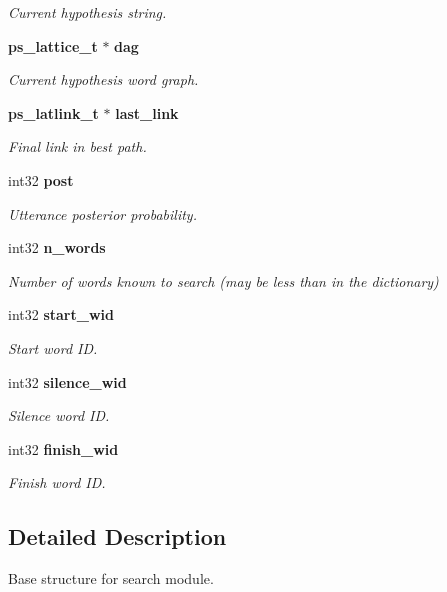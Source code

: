 \begin{DoxyCompactItemize}
\begin{DoxyCompactList}\small\item\em Current hypothesis string. \end{DoxyCompactList}\item 
{\bf ps\+\_\+lattice\+\_\+t} $\ast$ {\bf dag}
\begin{DoxyCompactList}\small\item\em Current hypothesis word graph. \end{DoxyCompactList}\item 
{\bf ps\+\_\+latlink\+\_\+t} $\ast$ {\bf last\+\_\+link}
\begin{DoxyCompactList}\small\item\em Final link in best path. \end{DoxyCompactList}\item 
int32 {\bf post}
\begin{DoxyCompactList}\small\item\em Utterance posterior probability. \end{DoxyCompactList}\item 
int32 {\bf n\+\_\+words}\label{structps__search__s_ad4d98deb905bd664ec44313ea0065b1a}

\begin{DoxyCompactList}\small\item\em Number of words known to search (may be less than in the dictionary) \end{DoxyCompactList}\item 
int32 {\bf start\+\_\+wid}
\begin{DoxyCompactList}\small\item\em Start word I\+D. \end{DoxyCompactList}\item 
int32 {\bf silence\+\_\+wid}
\begin{DoxyCompactList}\small\item\em Silence word I\+D. \end{DoxyCompactList}\item 
int32 {\bf finish\+\_\+wid}
\begin{DoxyCompactList}\small\item\em Finish word I\+D. \end{DoxyCompactList}\end{DoxyCompactItemize}


\subsection{Detailed Description}
Base structure for search module. 

